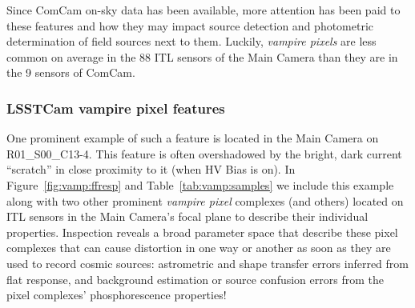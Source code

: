 Since ComCam on-sky data has been available, more attention has been paid to these features and how they may impact source detection and photometric determination of field sources next to them. Luckily, {\it vampire pixels} are less common on average in the 88 ITL sensors of the Main Camera than they are in the 9 sensors of ComCam. 

\subsubsection{LSSTCam vampire pixel
features}\label{lsstcam-vampire-pixel-features}

One prominent example of such a feature is located in the Main Camera on R01\_S00\_C13-4. This feature is often overshadowed by the bright, dark current ``scratch'' in close proximity to it (when HV Bias is on). In Figure~\ref{fig:vamp:ffresp} and Table~\ref{tab:vamp:samples} we include this example along with two other prominent {\it vampire pixel} complexes (and others) located on ITL sensors in the Main Camera's focal plane to describe their individual properties. Inspection reveals a broad parameter space that describe these pixel complexes that can cause distortion in one way or another as soon as they are used to record cosmic sources: astrometric and shape transfer errors inferred from flat response, and background estimation or source confusion errors from the pixel complexes' phosphorescence properties!




